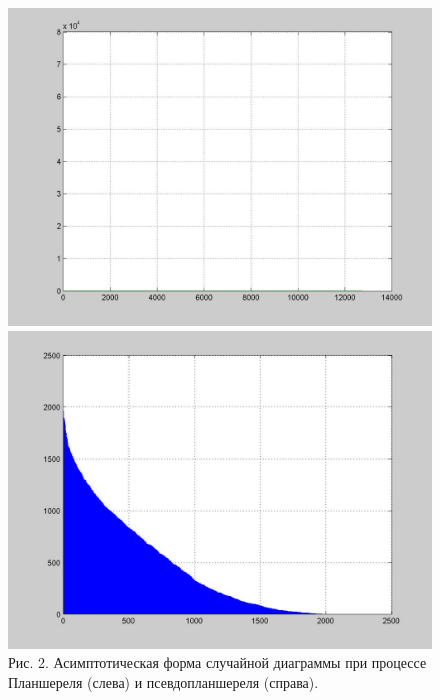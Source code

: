 \documentclass[12pt]{report}
\begin{document}
\begin{figure}[!ht]
\begin{center}
\includegraphics[scale=0.2]{Plansherel_assympt}
\includegraphics[scale=0.2]{ALPHA_assympt}
\\Рис. 2. Асимптотическая форма случайной диаграммы при процессе Планшереля (слева) и псевдопланшереля (справа).
\end{center}
\end{figure}
\end{document}
